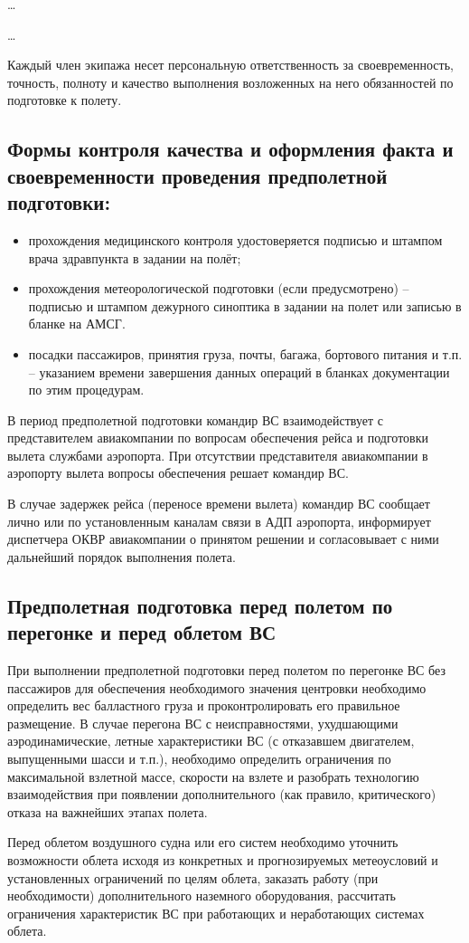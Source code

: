 \dots

\dots

Каждый член экипажа несет персональную ответственность за своевременность, точность, полноту и качество выполнения возложенных на него обязанностей по подготовке к полету.

\subsection{Формы контроля качества и оформления факта и своевременности проведения предполетной подготовки:}
\begin{itemize}
    \item	прохождения медицинского контроля удостоверяется подписью и штампом врача здравпункта в задании на полёт;
    \item	прохождения метеорологической подготовки (если предусмотрено) – подписью и штампом дежурного синоптика в задании на полет или записью в бланке на АМСГ. 
    \item	посадки пассажиров, принятия груза, почты, багажа, бортового питания и т.п. – указанием времени завершения данных операций в бланках документации по этим процедурам.
\end{itemize}

В период предполетной подготовки командир ВС взаимодействует с представителем авиакомпании по вопросам обеспечения рейса и подготовки вылета службами аэропорта. При отсутствии представителя авиакомпании в аэропорту вылета вопросы обеспечения решает командир ВС.

В случае задержек рейса (переносе времени вылета) командир ВС сообщает лично или по установленным каналам связи в АДП аэропорта, информирует диспетчера ОКВР авиакомпании о принятом решении и согласовывает с ними дальнейший порядок выполнения полета.

\subsection{Предполетная подготовка перед полетом по перегонке и перед облетом ВС}


При выполнении предполетной подготовки перед полетом по перегонке ВС без пассажиров для обеспечения необходимого значения центровки необходимо определить вес балластного груза и проконтролировать его правильное размещение. В случае перегона ВС с неисправностями, ухудшающими аэродинамические, летные характеристики ВС (с отказавшем двигателем, выпущенными шасси и т.п.), необходимо определить ограничения по максимальной взлетной массе, скорости на взлете и разобрать технологию взаимодействия при появлении дополнительного (как правило, критического) отказа на важнейших этапах полета.

Перед облетом воздушного судна или его систем необходимо уточнить возможности облета исходя из конкретных и прогнозируемых метеоусловий и установленных ограничений по целям облета, заказать работу (при необходимости) дополнительного наземного оборудования, рассчитать ограничения характеристик ВС при работающих и неработающих системах облета.
